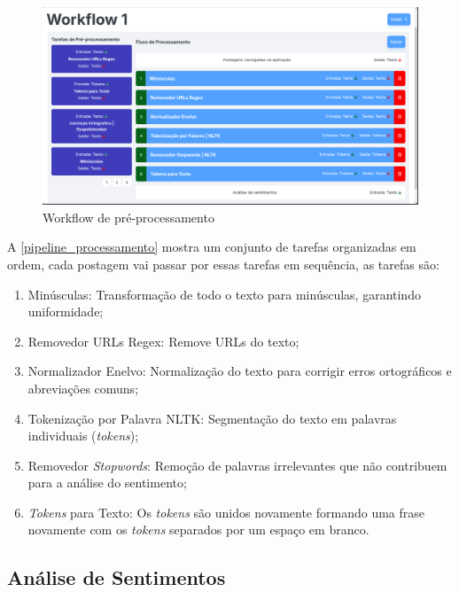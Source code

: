 \documentclass[
	12pt,				%
	oneside,			%
	a4paper,			%
	english,			%
	french,				%
	spanish,			%
	brazil				%
	]{abntex2}
\begin{document}
\begin{figure}[htbp]
\hypertarget{pipeline_processamento}{%
\caption{Workflow de pré-processamento}\label{pipeline_processamento}
\begin{center}
\includegraphics[scale=0.35]{imagens/sentilytics/estudo-caso/workflow.png}
\end{center}
}
\end{figure}

A \autoref{pipeline_processamento} mostra um conjunto de tarefas
organizadas em ordem, cada postagem vai passar por essas tarefas em
sequência, as tarefas são:

\begin{enumerate}
\def\labelenumi{\arabic{enumi})}
\tightlist
\item
  Minúsculas: Transformação de todo o texto para minúsculas, garantindo
  uniformidade;
\item
  Removedor URLs Regex: Remove URLs do texto;
\item
  Normalizador Enelvo: Normalização do texto para corrigir erros
  ortográficos e abreviações comuns;
\item
  Tokenização por Palavra \textbar{} NLTK: Segmentação do texto em
  palavras individuais (\emph{tokens});
\item
  Removedor \emph{Stopwords}: Remoção de palavras irrelevantes que não
  contribuem para a análise do sentimento;
\item
  \emph{Tokens} para Texto: Os \emph{tokens} são unidos novamente
  formando uma frase novamente com os \emph{tokens} separados por um
  espaço em branco.
\end{enumerate}

\hypertarget{anuxe1lise-de-sentimentos}{%
\subsection{Análise de Sentimentos}\label{anuxe1lise-de-sentimentos}}
\end{document}
